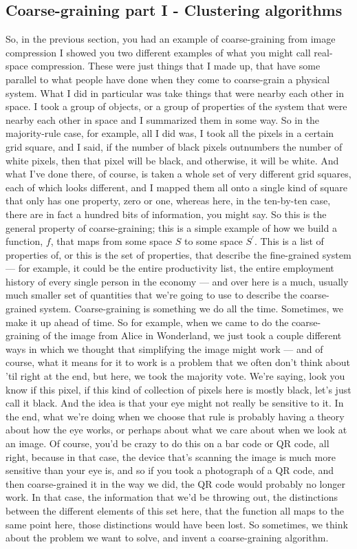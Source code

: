 \documentclass[]{article}
\begin{document}
\subsection{Coarse-graining part I - Clustering algorithms}

So, in the previous section,
you had an example of coarse-graining
from image compression
I showed you two different examples
of what you might call
real-space compression.
These were just things that
I made up,
that have some parallel
to what people have done
when they come to coarse-grain
a physical system.
What I did in particular
was take things
that were nearby each other in space.
I took a group
of objects, or a group of properties
of the system
that were nearby each other in space 
and I summarized them in some way.
So in the majority-rule case, for example,
all I did was, I took all the pixels
in a certain grid square, and I said, 
if the number of black pixels
outnumbers the number of white pixels,
then that pixel will be black,
and otherwise, it will be white.
And what I've done there, of course,
is taken a whole set of very different
grid squares, each of which
looks different,
and I mapped them all onto a single
kind of square
that only has one property, zero or one,
whereas here, in the ten-by-ten case,
there are in fact a hundred bits
of information, you might say.
So this is the general property
of coarse-graining; this is
a simple example of how we build
a function, $f$, that maps from some space $S$
to some space $S^\prime$.
This is a list of properties of, 
or this is the set of properties,
that describe the fine-grained system ---
for example, it could be the entire
productivity list,
the entire employment history
of every single person in the economy ---
and over here is a much,
usually much smaller set of quantities
that we're going to use to describe
the coarse-grained system.
Coarse-graining is something we do
all the time.
Sometimes, we make it up ahead of time.
So for example,
when we came to do the coarse-graining
of the image from Alice in Wonderland,
we just took a couple different ways
in which we thought
that simplifying the image
might work --- and of course,
what it means for it to work
is a problem that we often
don't think about 'til
right at the end, but here,
we took the majority vote.
We're saying,  look you know
if this pixel, if this kind of collection
of pixels here is mostly black,
let's just call it black.
And the idea is that your eye
might not really be
sensitive to it. In the end,
what we're doing when we choose
that rule is probably having a theory
about how the eye works,
or perhaps about what we care about
when we look at an image.
Of course, you'd be crazy to
do this on a bar code or QR code,
all right,
because in that case, the device
that's scanning the image
is much more sensitive
than your eye is,
and so if you took a photograph
of a QR code,
and then coarse-grained it
in the way we did,
the QR code would probably
no longer work.
In that case, the information that
we'd be throwing out,
the distinctions between the different
elements of this set here,
that the function all maps
to the same point here,
those distinctions would have been lost.
So sometimes,
we think about the problem we want
to solve,
and invent a coarse-graining algorithm.
\end{document}
